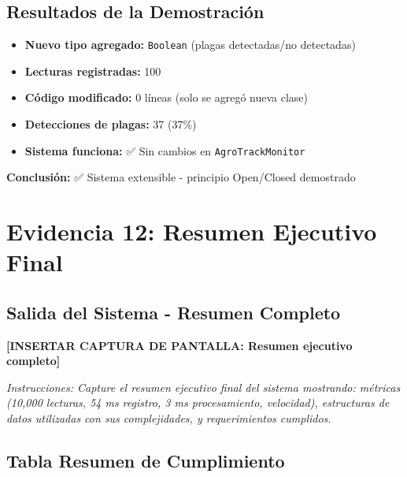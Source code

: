 \documentclass[12pt,a4paper]{article}
\begin{document}
\subsection{Resultados de la Demostración}

\begin{itemize}
    \item \textbf{Nuevo tipo agregado:} \texttt{Boolean} (plagas detectadas/no detectadas)
    \item \textbf{Lecturas registradas:} 100
    \item \textbf{Código modificado:} 0 líneas (solo se agregó nueva clase)
    \item \textbf{Detecciones de plagas:} 37 (37\%)
    \item \textbf{Sistema funciona:} ✅ Sin cambios en \texttt{AgroTrackMonitor}
\end{itemize}

\textbf{Conclusión:} ✅ Sistema extensible - principio Open/Closed demostrado


\section{Evidencia 12: Resumen Ejecutivo Final}

\subsection{Salida del Sistema - Resumen Completo}

\begin{tcolorbox}[colback=agrogreen!5,colframe=agrogreen,title=\textbf{RESUMEN EJECUTIVO FINAL}]
\vspace{0.5cm}
\textbf{[INSERTAR CAPTURA DE PANTALLA: Resumen ejecutivo completo]}

\textit{Instrucciones: Capture el resumen ejecutivo final del sistema mostrando: métricas (10,000 lecturas, 54 ms registro, 3 ms procesamiento, velocidad), estructuras de datos utilizadas con sus complejidades, y requerimientos cumplidos.}
\vspace{0.5cm}
\end{tcolorbox}

\subsection{Tabla Resumen de Cumplimiento}
\end{document}
